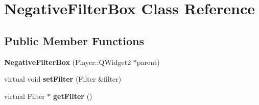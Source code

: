 \hypertarget{classNegativeFilterBox}{}\section{Negative\+Filter\+Box Class Reference}
\label{classNegativeFilterBox}
\subsection*{Public Member Functions}
\begin{DoxyCompactItemize}
\item 
\hypertarget{classNegativeFilterBox_a52ae63b39208f64d9457c4c952f6ebe7}{}{\bfseries Negative\+Filter\+Box} (Player\+::\+Q\+Widget2 $\ast$parent)\label{classNegativeFilterBox_a52ae63b39208f64d9457c4c952f6ebe7}

\item 
\hypertarget{classNegativeFilterBox_a09e99b0db09b8468ce7d7e0f98293ac5}{}virtual void {\bfseries set\+Filter} (Filter \&filter)\label{classNegativeFilterBox_a09e99b0db09b8468ce7d7e0f98293ac5}

\item 
\hypertarget{classNegativeFilterBox_ad7b14770615490d1445c958c79fd3adb}{}virtual Filter $\ast$ {\bfseries get\+Filter} ()\label{classNegativeFilterBox_ad7b14770615490d1445c958c79fd3adb}

\end{DoxyCompactItemize}
